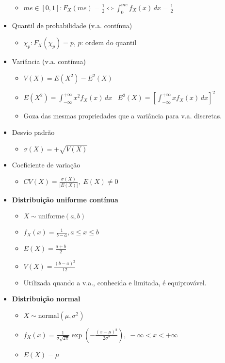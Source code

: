 \documentclass[a4paper]{report}
\newcommand{\bld}{\textbf}
\newcommand{\espaco}{\;\;\;}
\begin{document}
\begin{itemize}
		\begin{itemize}
			\item $me\in[0,1]: F_X(me)=\frac 1 2\Leftrightarrow \int_{0}^{me} f_X(x)\,dx=\frac 1 2$
		\end{itemize}
		\item Quantil de probabilidade (v.a. contínua)
			\begin{itemize}
		\item $\chi_p:F_X(\chi_p)=p$, $p$: ordem do quantil
		\end{itemize}
		\item Variância (v.a. contínua)
		\begin{itemize}
		\item $V(X)=E(X^2)-E^2(X)$
		\item $E(X^2)=\int_{-\infty}^{+\infty} x^2f_X(x)\,dx\espaco E^2(X)=\left[\int_{-\infty}^{+\infty}xf_X(x)\,dx\right]^2$
		\item Goza das mesmas propriedades que a variância para v.a. discretas.
		\end{itemize}
		\item Desvio padrão
		\begin{itemize}
		\item $\sigma(X)=+\sqrt{V(X)}$
		\end{itemize}
		\item Coeficiente de variação
		\begin{itemize}
		\item $CV(X)=\frac{\sigma(X)}{|E(X)|},\;E(X)\neq 0$
		\end{itemize}
		\item {\large \bld{Distribuição uniforme contínua}}
		\begin{itemize}
		\item $X\sim \text{uniforme}(a,b)$
		\item $f_X(x)=\frac 1{b-a},a\leq x\leq b$
		\item $E(X)=\frac{a+b}2$
		\item $V(X)=\frac{(b-a)^2}{12}$
		\item Utilizada quando a v.a., conhecida e limitada, é equiprovável.
		\end{itemize}
		\item {\large \bld{Distribuição normal}}
		\begin{itemize}
		\item $X\sim \text{normal}(\mu,\sigma^2)$
		\item $f_X(x)=\frac 1{\sigma\sqrt{2\pi}}\exp\left(-\frac{(x-\mu)^2}{2\sigma^2}\right),\;-\infty<x<+\infty$
		\item $E(X)=\mu$

\end{itemize}
\end{itemize}
\end{document}
